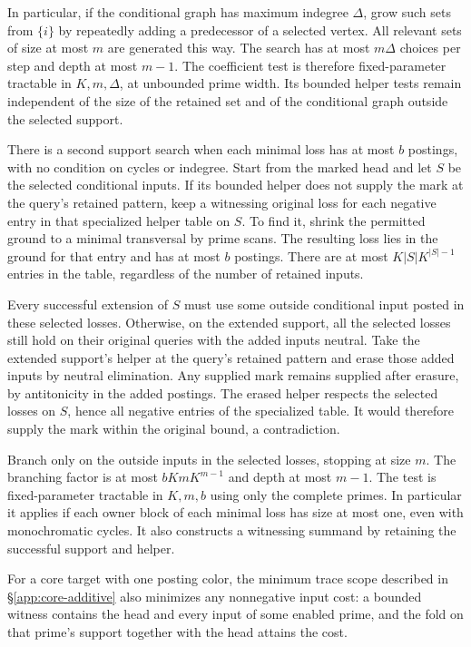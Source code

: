 In particular, if the conditional graph has
maximum indegree $\Delta$, grow such sets from
$\{i\}$ by repeatedly adding a predecessor of
a selected vertex. All relevant sets of size at
most $m$ are generated this way. The search has
at most $m\Delta$ choices per step and depth at
most $m-1$. The coefficient test is therefore
fixed-parameter tractable in $K,m,\Delta$, at
unbounded prime width. Its bounded helper tests
remain independent of the size of the retained
set and of the conditional graph outside the
selected support.

There is a second support search when each minimal
loss has at most $b$ postings, with no condition
on cycles or indegree. Start from the marked head
and let $S$ be the selected conditional inputs.
If its bounded helper does not supply the mark at
the query's retained pattern, keep a witnessing
original loss for each negative entry in that
specialized helper table on $S$. To find it, shrink
the permitted ground to a minimal transversal by
prime scans. The resulting loss lies in the ground
for that entry and has at most $b$ postings. There
are at most $K|S|K^{|S|-1}$ entries in the table,
regardless of the number of retained inputs.

Every successful extension of $S$ must use some
outside conditional input posted in these selected
losses. Otherwise, on the extended support, all
the selected losses still hold on their original
queries with the added inputs neutral. Take the
extended support's helper at the query's retained
pattern and erase those added inputs by neutral
elimination. Any supplied mark remains supplied
after erasure, by antitonicity in the added
postings. The erased helper respects the selected
losses on $S$, hence all negative entries of the
specialized table. It would therefore supply the
mark within the original bound, a contradiction.

Branch only on the outside inputs in the selected
losses, stopping at size $m$. The branching factor
is at most $bKmK^{m-1}$ and depth at most $m-1$.
The test is fixed-parameter tractable in $K,m,b$
using only the complete primes. In particular it
applies if each owner block of each minimal loss
has size at most one, even with monochromatic
cycles. It also constructs a witnessing summand
by retaining the successful support and helper.

For a core target with one posting color, the
minimum trace scope described in
\S\ref{app:core-additive} also minimizes any
nonnegative input cost: a bounded witness contains
the head and every input of some enabled prime,
and the fold on that prime's support together with
the head attains the cost.

